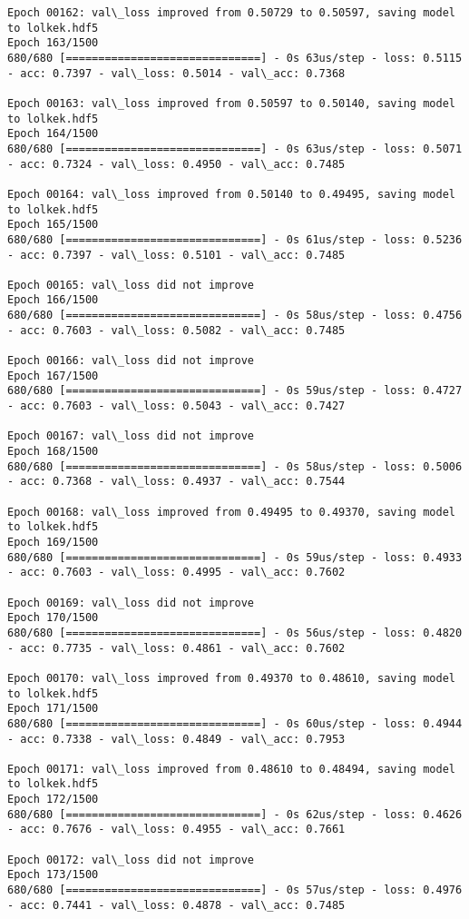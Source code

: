 \documentclass[11pt]{article}
\begin{document}
\begin{Verbatim}[commandchars=\\\{\}]
Epoch 00162: val\_loss improved from 0.50729 to 0.50597, saving model to lolkek.hdf5
Epoch 163/1500
680/680 [==============================] - 0s 63us/step - loss: 0.5115 - acc: 0.7397 - val\_loss: 0.5014 - val\_acc: 0.7368

Epoch 00163: val\_loss improved from 0.50597 to 0.50140, saving model to lolkek.hdf5
Epoch 164/1500
680/680 [==============================] - 0s 63us/step - loss: 0.5071 - acc: 0.7324 - val\_loss: 0.4950 - val\_acc: 0.7485

Epoch 00164: val\_loss improved from 0.50140 to 0.49495, saving model to lolkek.hdf5
Epoch 165/1500
680/680 [==============================] - 0s 61us/step - loss: 0.5236 - acc: 0.7397 - val\_loss: 0.5101 - val\_acc: 0.7485

Epoch 00165: val\_loss did not improve
Epoch 166/1500
680/680 [==============================] - 0s 58us/step - loss: 0.4756 - acc: 0.7603 - val\_loss: 0.5082 - val\_acc: 0.7485

Epoch 00166: val\_loss did not improve
Epoch 167/1500
680/680 [==============================] - 0s 59us/step - loss: 0.4727 - acc: 0.7603 - val\_loss: 0.5043 - val\_acc: 0.7427

Epoch 00167: val\_loss did not improve
Epoch 168/1500
680/680 [==============================] - 0s 58us/step - loss: 0.5006 - acc: 0.7368 - val\_loss: 0.4937 - val\_acc: 0.7544

Epoch 00168: val\_loss improved from 0.49495 to 0.49370, saving model to lolkek.hdf5
Epoch 169/1500
680/680 [==============================] - 0s 59us/step - loss: 0.4933 - acc: 0.7603 - val\_loss: 0.4995 - val\_acc: 0.7602

Epoch 00169: val\_loss did not improve
Epoch 170/1500
680/680 [==============================] - 0s 56us/step - loss: 0.4820 - acc: 0.7735 - val\_loss: 0.4861 - val\_acc: 0.7602

Epoch 00170: val\_loss improved from 0.49370 to 0.48610, saving model to lolkek.hdf5
Epoch 171/1500
680/680 [==============================] - 0s 60us/step - loss: 0.4944 - acc: 0.7338 - val\_loss: 0.4849 - val\_acc: 0.7953

Epoch 00171: val\_loss improved from 0.48610 to 0.48494, saving model to lolkek.hdf5
Epoch 172/1500
680/680 [==============================] - 0s 62us/step - loss: 0.4626 - acc: 0.7676 - val\_loss: 0.4955 - val\_acc: 0.7661

Epoch 00172: val\_loss did not improve
Epoch 173/1500
680/680 [==============================] - 0s 57us/step - loss: 0.4976 - acc: 0.7441 - val\_loss: 0.4878 - val\_acc: 0.7485


\end{Verbatim}
\end{document}
